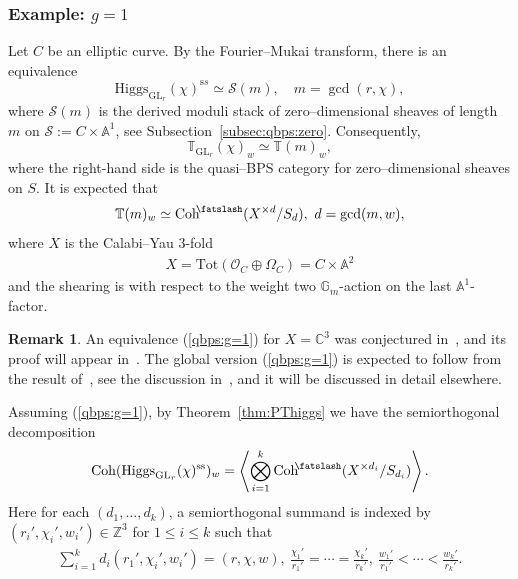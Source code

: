 \documentclass [11pt,oneside,a4paper,mathscr]{amsart}
\theoremstyle{definition}
\newtheorem{remark}[thm]{Remark}
\renewcommand{\leq}{\leqslant}
\newcommand{\Coh}{\operatorname{Coh}}
\newcommand{\GL}{\operatorname{GL}}
\newcommand{\shear}{{\mathbin{\mkern-6mu\fatslash}}}
\newcommand{\Hig}{\mathrm{Higgs}}
\begin{document}
\subsubsection*{Example: $g=1$}
Let $C$ be an elliptic curve. By the Fourier–Mukai transform, there is an equivalence
\[
  \Hig_{\GL_r}(\chi)^{\mathrm ss} \simeq \mathcal{S}(m),
  \quad m=\gcd(r,\chi),
\]
where $\mathcal{S}(m)$ is the derived moduli stack of zero–dimensional sheaves of length $m$
on $\mathcal{S}:=C\times\mathbb{A}^1$, see Subsection~\ref{subsec:qbps:zero}. Consequently,
\[
  \mathbb{T}_{\GL_r}(\chi)_w \simeq \mathbb{T}(m)_w,
\]
where the right-hand side is the quasi–BPS category for zero–dimensional sheaves on $S$.
It is expected that
\begin{align}\label{qbps:g=1}
\mathbb{T}(m)_w \simeq \Coh^{\shear}(X^{\times d}/S_d), \ d=\gcd(m, w),
\end{align}
where $X$ is the Calabi–Yau 3-fold
\begin{align*}X=\mathrm{Tot}(\mathcal{O}_C\oplus \Omega_C)
=C\times \mathbb{A}^2
\end{align*}
and the shearing 
is with respect to the weight two $\mathbb{G}_m$-action on the last $\mathbb{A}^1$-factor. 
\begin{remark}\label{rmk:CPT}
An equivalence (\ref{qbps:g=1}) for $X=\mathbb{C}^3$ was conjectured in~\cite{PT0}, and its 
proof will appear in~\cite{CauPT}. The global version (\ref{qbps:g=1}) is expected to follow from 
the result of~\cite{CauPT}, see the discussion in~\cite[Subsection 1.3]{PT2}, and it will be discussed in detail elsewhere. 
\end{remark}

Assuming (\ref{qbps:g=1}), by Theorem~\ref{thm:PThiggs} we have the semiorthogonal 
decomposition 
\begin{align*}
    \Coh(\Hig_{\GL_r}(\chi)^{\mathrm{ss}})_w = 
    \left\langle \bigotimes_{i=1}^k \Coh^{\shear}(X^{\times d_i}/S_{d_i})  \right\rangle. 
\end{align*}
Here for each $(d_1, \ldots, d_k)$, a semiorthogonal summand is indexed by 
$(r_i', \chi_i', w_i')\in \mathbb{Z}^3$ for $1\leq i\leq k$ such that 
\begin{align*}
    \sum_{i=1}^k d_i(r_1', \chi_i', w_i')=(r, \chi, w), \ 
    \frac{\chi_1'}{r_1'}=\cdots= \frac{\chi_k'}{r_k'}, \ 
    \frac{w_1'}{r_1'}<\cdots<\frac{w_k'}{r_k'}. 
\end{align*}
\end{document}
